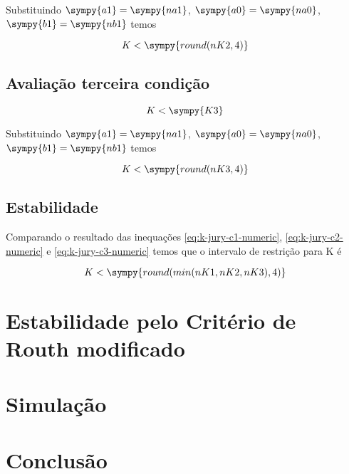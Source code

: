\documentclass[a4paper,11pt]{article}
\newcommand{\npy}[1]{\sympy{round(#1,4)}}
\begin{document}
Substituindo $\sympy{a1} = \sympy{na1}$, $\sympy{a0} = \sympy{na0}$, $\sympy{b1} = \sympy{nb1}$ temos

\begin{equation}\label{eq:k-jury-c2-numeric}
    K < \npy{nK2}
\end{equation}

\subsection{Avaliação terceira condição}

\begin{equation}\label{eq:k-jury-c3}
    K < \sympy{K3}
\end{equation}

Substituindo $\sympy{a1} = \sympy{na1}$, $\sympy{a0} = \sympy{na0}$, $\sympy{b1} = \sympy{nb1}$ temos

\begin{equation}\label{eq:k-jury-c3-numeric}
    K < \npy{nK3}
\end{equation}

\subsection{Estabilidade}

Comparando o resultado das inequações \ref{eq:k-jury-c1-numeric}, \ref{eq:k-jury-c2-numeric} e \ref{eq:k-jury-c3-numeric} temos que o intervalo de restrição para K é

\begin{equation}\label{eq:k-jury-result}
    K < \sympy{round(min(nK1,nK2,nK3),4)}
\end{equation}


\section{Estabilidade pelo Critério de Routh modificado}


\section{Simulação}


\section{Conclusão}






\end{document}
